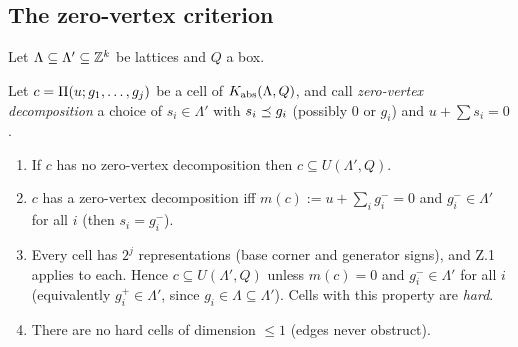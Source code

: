 \subsection{The zero-vertex criterion}\label{sec:zero}
Let $\Lambda\subseteq\Lambda'\subseteq\mathbb Z^k$ be lattices and $Q$ a box.
\begin{proposition}\label{prop:Z}
Let $c=\Pi(u;g_1,\dots,g_j)$ be a cell of $K_{\mathrm{abs}}(\Lambda,Q)$, and call \emph{zero-vertex decomposition} a choice of $s_i\in\Lambda'$ with $s_i\preceq g_i$ (possibly $0$ or $g_i$) and $u+\sum s_i=0$.
\begin{enumerate}[label=(Z.\arabic*)]
\item If $c$ has no zero-vertex decomposition then $c\subseteq U(\Lambda',Q)$.
\item $c$ has a zero-vertex decomposition iff $m(c):=u+\sum_ig_i^-=0$ and $g_i^-\in\Lambda'$ for all $i$ (then $s_i=g_i^-$).
\item Every cell has $2^j$ representations (base corner and generator signs), and Z.1 applies to each. Hence $c\subseteq U(\Lambda',Q)$ unless $m(c)=0$ and $g_i^-\in\Lambda'$ for all $i$ (equivalently $g_i^+\in\Lambda'$, since $g_i\in\Lambda\subseteq\Lambda'$). Cells with this property are \emph{hard}.
\item There are no hard cells of dimension $\le1$ (edges never obstruct).
\end{enumerate}
\end{proposition}
